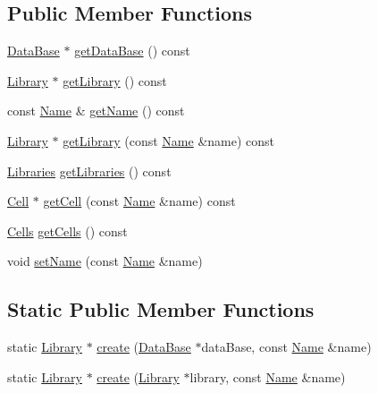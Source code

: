 \subsection*{Public Member Functions}
\begin{DoxyCompactItemize}
\item 
\mbox{\hyperlink{classHurricane_1_1DataBase}{Data\+Base}} $\ast$ \mbox{\hyperlink{classHurricane_1_1Library_a657cbf1ac426ef6def0b5b51f80ed248}{get\+Data\+Base}} () const
\item 
\mbox{\hyperlink{classHurricane_1_1Library}{Library}} $\ast$ \mbox{\hyperlink{classHurricane_1_1Library_a5299d19afc96c535d557b86ba42eaa82}{get\+Library}} () const
\item 
const \mbox{\hyperlink{classHurricane_1_1Name}{Name}} \& \mbox{\hyperlink{classHurricane_1_1Library_a13a9c4d0c43e2e1df09b7c0ee59f577f}{get\+Name}} () const
\item 
\mbox{\hyperlink{classHurricane_1_1Library}{Library}} $\ast$ \mbox{\hyperlink{classHurricane_1_1Library_a8589e1ff3db5ef288c3027ceef28636b}{get\+Library}} (const \mbox{\hyperlink{classHurricane_1_1Name}{Name}} \&name) const
\item 
\mbox{\hyperlink{namespaceHurricane_a2868a53bbb0507710460ff02fab77cad}{Libraries}} \mbox{\hyperlink{classHurricane_1_1Library_a43b3703b939b7e70261d1f9319db2bb0}{get\+Libraries}} () const
\item 
\mbox{\hyperlink{classHurricane_1_1Cell}{Cell}} $\ast$ \mbox{\hyperlink{classHurricane_1_1Library_a2e6bb294c611db79e00a5a6ea00974d5}{get\+Cell}} (const \mbox{\hyperlink{classHurricane_1_1Name}{Name}} \&name) const
\item 
\mbox{\hyperlink{namespaceHurricane_a8b4ab14b26f36f43d83a50294410b44a}{Cells}} \mbox{\hyperlink{classHurricane_1_1Library_aae3e47aef08e50f9858fb79537f6eb41}{get\+Cells}} () const
\item 
void \mbox{\hyperlink{classHurricane_1_1Library_a1181e4e87f42749bdfda253cad658ea9}{set\+Name}} (const \mbox{\hyperlink{classHurricane_1_1Name}{Name}} \&name)
\end{DoxyCompactItemize}
\subsection*{Static Public Member Functions}
\begin{DoxyCompactItemize}
\item 
static \mbox{\hyperlink{classHurricane_1_1Library}{Library}} $\ast$ \mbox{\hyperlink{classHurricane_1_1Library_af304234d0347128300df5ad09801229d}{create}} (\mbox{\hyperlink{classHurricane_1_1DataBase}{Data\+Base}} $\ast$data\+Base, const \mbox{\hyperlink{classHurricane_1_1Name}{Name}} \&name)
\item 
static \mbox{\hyperlink{classHurricane_1_1Library}{Library}} $\ast$ \mbox{\hyperlink{classHurricane_1_1Library_a36bc1af0e48307180be81a81d462650e}{create}} (\mbox{\hyperlink{classHurricane_1_1Library}{Library}} $\ast$library, const \mbox{\hyperlink{classHurricane_1_1Name}{Name}} \&name)
\end{DoxyCompactItemize}


